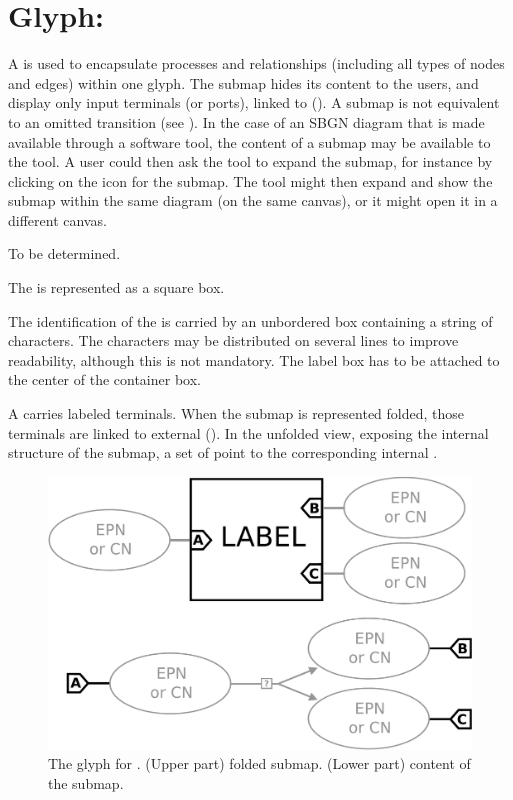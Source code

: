 \color{red}
\section{Glyph: }
\label{sec:submap}

A  is used to encapsulate processes and relationships (including all types of nodes and edges) within one glyph.  The submap hides its content to the users, and display only input terminals (or ports), linked to  ().  A submap is not equivalent to an omitted transition (see ).  In the case of an SBGN diagram that is made available through a software tool, the content of a submap may be available to the tool.  A user could then ask the tool to expand the submap, for instance by clicking on the icon for the submap.  The tool might then expand and show the submap within the same diagram (on the same canvas), or it might open it in a different canvas.

\begin{glyphDescription}

\glyphSboTerm To be determined.

\glyphContainer The  is represented as a square box.

\glyphLabel The identification of the  is carried by an unbordered box containing a string of characters.  The characters may be distributed on several lines to improve readability, although this is not mandatory.  The label box has to be attached to the center of the container box.

\glyphAux A  carries labeled terminals.  When the submap is represented folded, those terminals are linked to external  ().  In the unfolded view, exposing the internal structure of the submap, a set of  point to the corresponding internal .

\end{glyphDescription}

\begin{figure}[H]
  \centering
  \includegraphics[scale = 0.22]{images/submap}
  \caption{The \ER glyph for . (Upper part) folded submap. (Lower part) content of the submap.}
  \label{fig:submap}
\end{figure}

